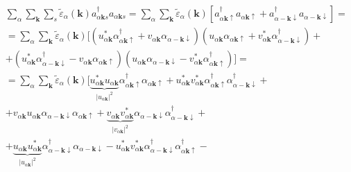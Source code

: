 \documentclass[class=article, crop=false]{standalone}
\begin{document}
\begin{equation}\label{key}
	\begin{split}
		& \sum_{ \alpha} \sum_{ \mathbf{k}} \sum_{s} \tilde{ \varepsilon}_{ \alpha} ( \mathbf{k}) a^{ \dagger}_{ \alpha \mathbf{k} s} a_{ \alpha \mathbf{k} s} = \sum_{ \alpha} \sum_{ \mathbf{k}} \tilde{ \varepsilon}_{ \alpha} ( \mathbf{k}) \left[ a^{ \dagger}_{ \alpha \mathbf{k} \uparrow} a_{ \alpha \mathbf{k} \uparrow} + a^{ \dagger}_{ \alpha - \mathbf{k} \downarrow} a_{ \alpha - \mathbf{k} \downarrow} \right] = \\
		& = \sum_{ \alpha} \sum_{ \mathbf{k}} \tilde{ \varepsilon}_{ \alpha} ( \mathbf{k}) 
		[ \left( u_{ \alpha \mathbf{k}}^{ \ast} \alpha_{ \alpha \mathbf{k} \uparrow}^{ \dagger} + v_{ \alpha \mathbf{k}} \alpha_{ \alpha - \mathbf{k} \downarrow} \right)
		\left( u_{ \alpha \mathbf{k}} \alpha_{ \alpha \mathbf{k} \uparrow} + v_{ \alpha \mathbf{k}}^{ \ast} \alpha_{ \alpha - \mathbf{k} \downarrow}^{ \dagger} \right) + \\
		& + \left( u_{ \alpha \mathbf{k}}^{ \ast} \alpha_{ \alpha - \mathbf{k} \downarrow}^{ \dagger} - v_{ \alpha \mathbf{k}} \alpha_{ \alpha \mathbf{k} \uparrow} \right)
		\left( u_{ \alpha \mathbf{k}} \alpha_{ \alpha - \mathbf{k} \downarrow} - v_{ \alpha \mathbf{k}}^{ \ast} \alpha_{ \alpha \mathbf{k} \uparrow}^{ \dagger} \right) ] = \\
		& = \sum_{ \alpha} \sum_{ \mathbf{k}} \tilde{ \varepsilon}_{ \alpha} ( \mathbf{k}) 
		[ \underbrace{u_{ \alpha \mathbf{k}}^{ \ast} u_{ \alpha \mathbf{k}}}_{ \left| u_{ \alpha \mathbf{k}} \right|^{2}} \alpha_{ \alpha \mathbf{k} \uparrow}^{ \dagger} \alpha_{ \alpha \mathbf{k} \uparrow} + 
		u_{ \alpha \mathbf{k}}^{ \ast} v_{ \alpha \mathbf{k}}^{ \ast} \alpha_{ \alpha \mathbf{k} \uparrow}^{ \dagger} \alpha_{ \alpha - \mathbf{k} \downarrow}^{ \dagger} + \\
		& + v_{ \alpha \mathbf{k}} u_{ \alpha \mathbf{k}} \alpha_{ \alpha - \mathbf{k} \downarrow} \alpha_{ \alpha \mathbf{k} \uparrow} + 
		\underbrace{v_{ \alpha \mathbf{k}} v_{ \alpha \mathbf{k}}^{ \ast}}_{ \left| v_{ \alpha \mathbf{k}} \right|^{2}} \alpha_{ \alpha - \mathbf{k} \downarrow} \alpha_{ \alpha - \mathbf{k} \downarrow}^{ \dagger} + \\
		& + \underbrace{u_{ \alpha \mathbf{k}} u_{ \alpha \mathbf{k}}^{ \ast}}_{ \left| u_{ \alpha \mathbf{k}} \right|^{2}} \alpha_{ \alpha - \mathbf{k} \downarrow}^{ \dagger} \alpha_{ \alpha - \mathbf{k} \downarrow} - 
		u_{ \alpha \mathbf{k}}^{ \ast} v_{ \alpha \mathbf{k}}^{ \ast} \alpha_{ \alpha - \mathbf{k} \downarrow}^{ \dagger} \alpha_{ \alpha \mathbf{k} \uparrow}^{ \dagger} - \\

\end{split}
\end{equation}
\end{document}
